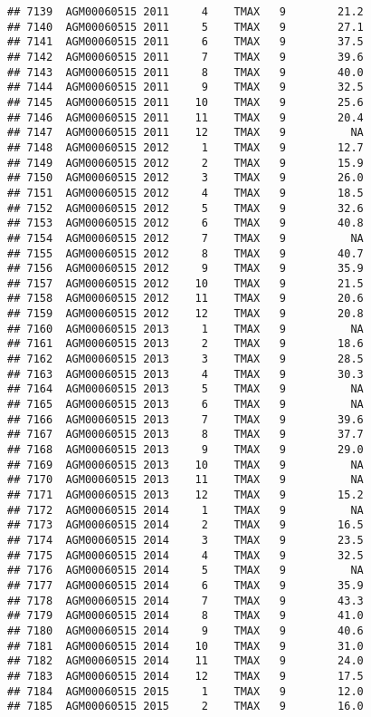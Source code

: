\documentclass{article}\usepackage[]{graphicx}\usepackage[]{color}
\makeatletter
\newenvironment{kframe}{%
 \def\at@end@of@kframe{}%
 \ifinner\ifhmode%
  \def\at@end@of@kframe{\end{minipage}}%
  \begin{minipage}{\columnwidth}%
 \fi\fi%
 \def\FrameCommand##1{\hskip\@totalleftmargin \hskip-\fboxsep
 \colorbox{shadecolor}{##1}\hskip-\fboxsep
     \hskip-\linewidth \hskip-\@totalleftmargin \hskip\columnwidth}%
 \MakeFramed {\advance\hsize-\width
   \@totalleftmargin\z@ \linewidth\hsize
   \@setminipage}}%
 {\par\unskip\endMakeFramed%
 \at@end@of@kframe}
\newenvironment{knitrout}{}{} %
\makeatother
\begin{document}
\begin{knitrout}
\begin{kframe}
\begin{verbatim}
## 7139  AGM00060515 2011     4    TMAX   9        21.2
## 7140  AGM00060515 2011     5    TMAX   9        27.1
## 7141  AGM00060515 2011     6    TMAX   9        37.5
## 7142  AGM00060515 2011     7    TMAX   9        39.6
## 7143  AGM00060515 2011     8    TMAX   9        40.0
## 7144  AGM00060515 2011     9    TMAX   9        32.5
## 7145  AGM00060515 2011    10    TMAX   9        25.6
## 7146  AGM00060515 2011    11    TMAX   9        20.4
## 7147  AGM00060515 2011    12    TMAX   9          NA
## 7148  AGM00060515 2012     1    TMAX   9        12.7
## 7149  AGM00060515 2012     2    TMAX   9        15.9
## 7150  AGM00060515 2012     3    TMAX   9        26.0
## 7151  AGM00060515 2012     4    TMAX   9        18.5
## 7152  AGM00060515 2012     5    TMAX   9        32.6
## 7153  AGM00060515 2012     6    TMAX   9        40.8
## 7154  AGM00060515 2012     7    TMAX   9          NA
## 7155  AGM00060515 2012     8    TMAX   9        40.7
## 7156  AGM00060515 2012     9    TMAX   9        35.9
## 7157  AGM00060515 2012    10    TMAX   9        21.5
## 7158  AGM00060515 2012    11    TMAX   9        20.6
## 7159  AGM00060515 2012    12    TMAX   9        20.8
## 7160  AGM00060515 2013     1    TMAX   9          NA
## 7161  AGM00060515 2013     2    TMAX   9        18.6
## 7162  AGM00060515 2013     3    TMAX   9        28.5
## 7163  AGM00060515 2013     4    TMAX   9        30.3
## 7164  AGM00060515 2013     5    TMAX   9          NA
## 7165  AGM00060515 2013     6    TMAX   9          NA
## 7166  AGM00060515 2013     7    TMAX   9        39.6
## 7167  AGM00060515 2013     8    TMAX   9        37.7
## 7168  AGM00060515 2013     9    TMAX   9        29.0
## 7169  AGM00060515 2013    10    TMAX   9          NA
## 7170  AGM00060515 2013    11    TMAX   9          NA
## 7171  AGM00060515 2013    12    TMAX   9        15.2
## 7172  AGM00060515 2014     1    TMAX   9          NA
## 7173  AGM00060515 2014     2    TMAX   9        16.5
## 7174  AGM00060515 2014     3    TMAX   9        23.5
## 7175  AGM00060515 2014     4    TMAX   9        32.5
## 7176  AGM00060515 2014     5    TMAX   9          NA
## 7177  AGM00060515 2014     6    TMAX   9        35.9
## 7178  AGM00060515 2014     7    TMAX   9        43.3
## 7179  AGM00060515 2014     8    TMAX   9        41.0
## 7180  AGM00060515 2014     9    TMAX   9        40.6
## 7181  AGM00060515 2014    10    TMAX   9        31.0
## 7182  AGM00060515 2014    11    TMAX   9        24.0
## 7183  AGM00060515 2014    12    TMAX   9        17.5
## 7184  AGM00060515 2015     1    TMAX   9        12.0
## 7185  AGM00060515 2015     2    TMAX   9        16.0

\end{verbatim}
\end{kframe}
\end{knitrout}
\end{document}
